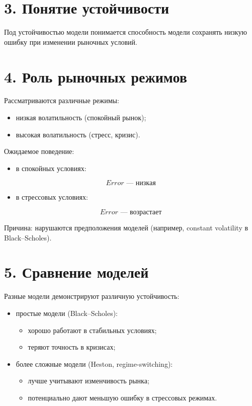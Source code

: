 \documentclass[12pt]{article}
\begin{document}
\section*{3. Понятие устойчивости}

Под устойчивостью модели понимается способность модели сохранять низкую ошибку при изменении рыночных условий.

\section*{4. Роль рыночных режимов}

Рассматриваются различные режимы:

\begin{itemize}
    \item низкая волатильность (спокойный рынок);
    \item высокая волатильность (стресс, кризис).
\end{itemize}

Ожидаемое поведение:

\begin{itemize}
    \item в спокойных условиях:
\end{itemize}

\[
Error \text{ --- низкая}
\]

\begin{itemize}
    \item в стрессовых условиях:
\end{itemize}

\[
Error \text{ --- возрастает}
\]

Причина: нарушаются предположения моделей (например, constant volatility в Black--Scholes).

\section*{5. Сравнение моделей}

Разные модели демонстрируют различную устойчивость:

\begin{itemize}
    \item простые модели (Black--Scholes):
    \begin{itemize}
        \item хорошо работают в стабильных условиях;
        \item теряют точность в кризисах;
    \end{itemize}
    \item более сложные модели (Heston, regime-switching):
    \begin{itemize}
        \item лучше учитывают изменчивость рынка;
        \item потенциально дают меньшую ошибку в стрессовых режимах.
    \end{itemize}
\end{itemize}
\end{document}
